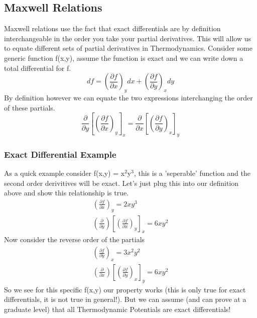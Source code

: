 \documentclass{article}
\begin{document}
\subsection*{Maxwell Relations}
Maxwell relations use the fact that exact differentials are by definition interchangeable in the order you take your partial derivatives.
This will allow us to equate different sets of partial derivatives in Thermodynamics. 
Consider some generic function f(x,y), assume the function is exact and we can write down a total differential for f. 
\begin{equation}
    df = \left(\frac{\partial f}{\partial x}\right)_y dx + \left(\frac{\partial f}{\partial y}\right)_x dy
\end{equation}
By definition however we can equate the two expressions interchanging the order of these partials. 
\begin{equation}
    \frac{\partial}{\partial y} \left[\left(\frac{\partial f}{\partial x}\right)_y \right]_x =  \frac{\partial}{\partial x} \left[\left(\frac{\partial f}{\partial y}\right)_x \right]_y
\end{equation}

\subsubsection*{Exact Differential Example}
As a quick example consider f(x,y) = x$^2$y$^3$, this is a 'seperable' function and the second order derivitives will be exact. 
Let's just plug this into our definition above and show this relationship is true. 
\begin{equation}
\begin{split}
    \left(\frac{\partial f}{\partial x}\right)_y = 2xy^3 \\
    \left(\frac{\partial}{\partial y}\right)\left[ \left(\frac{\partial f}{\partial x}\right)_y\right]_x = 6xy^2
    \end{split}
\end{equation}
Now consider the reverse order of the partials
\begin{equation}
\begin{split}
    \left(\frac{\partial f}{\partial y}\right)_x = 3x^2y^2 \\
    \left(\frac{\partial}{\partial x}\right)\left[ \left(\frac{\partial f}{\partial y}\right)_x\right]_y = 6xy^2
    \end{split}
\end{equation}
So we see for this specific f(x,y) our property works (this is only true for exact differentials, it is not true in general!). 
But we can assume (and can prove at a graduate level) that all Thermodynamic Potentials are exact differentials!
\end{document}
